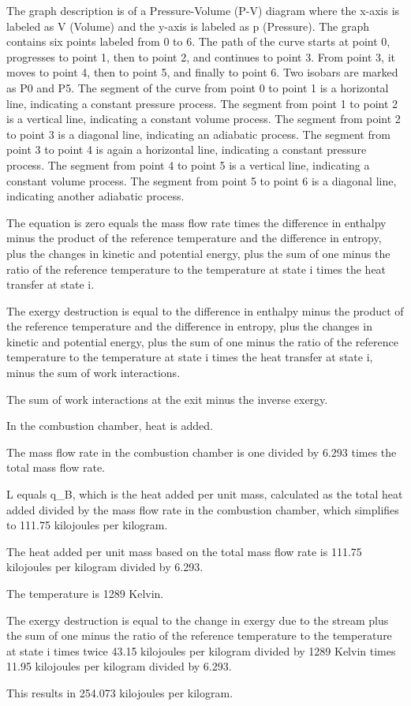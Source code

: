 The graph description is of a Pressure-Volume (P-V) diagram where the x-axis is labeled as V (Volume) and the y-axis is labeled as p (Pressure). The graph contains six points labeled from 0 to 6. The path of the curve starts at point 0, progresses to point 1, then to point 2, and continues to point 3. From point 3, it moves to point 4, then to point 5, and finally to point 6. Two isobars are marked as P0 and P5. The segment of the curve from point 0 to point 1 is a horizontal line, indicating a constant pressure process. The segment from point 1 to point 2 is a vertical line, indicating a constant volume process. The segment from point 2 to point 3 is a diagonal line, indicating an adiabatic process. The segment from point 3 to point 4 is again a horizontal line, indicating a constant pressure process. The segment from point 4 to point 5 is a vertical line, indicating a constant volume process. The segment from point 5 to point 6 is a diagonal line, indicating another adiabatic process.

The equation is zero equals the mass flow rate times the difference in enthalpy minus the product of the reference temperature and the difference in entropy, plus the changes in kinetic and potential energy, plus the sum of one minus the ratio of the reference temperature to the temperature at state i times the heat transfer at state i.

The exergy destruction is equal to the difference in enthalpy minus the product of the reference temperature and the difference in entropy, plus the changes in kinetic and potential energy, plus the sum of one minus the ratio of the reference temperature to the temperature at state i times the heat transfer at state i, minus the sum of work interactions.

The sum of work interactions at the exit minus the inverse exergy.

In the combustion chamber, heat is added.

The mass flow rate in the combustion chamber is one divided by 6.293 times the total mass flow rate.

L equals q_B, which is the heat added per unit mass, calculated as the total heat added divided by the mass flow rate in the combustion chamber, which simplifies to 111.75 kilojoules per kilogram.

The heat added per unit mass based on the total mass flow rate is 111.75 kilojoules per kilogram divided by 6.293.

The temperature is 1289 Kelvin.

The exergy destruction is equal to the change in exergy due to the stream plus the sum of one minus the ratio of the reference temperature to the temperature at state i times twice 43.15 kilojoules per kilogram divided by 1289 Kelvin times 11.95 kilojoules per kilogram divided by 6.293.

This results in 254.073 kilojoules per kilogram.